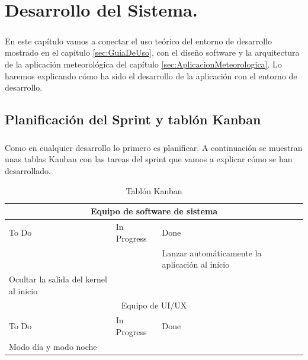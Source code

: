 \chapter{Desarrollo del Sistema.}\label{sec:Desarrollo}

\paragraph{}En este capítulo vamos a conectar el uso teórico del entorno de desarrollo
mostrado en el capítulo \ref{sec:GuiaDeUso}, con el diseño software y la arquitectura de
la aplicación meteorológica del capítulo \ref{sec:AplicacionMeteorologica}. Lo haremos
explicando cómo ha sido el desarrollo de la aplicación con el entorno de desarrollo.

\section{Planificación del Sprint y tablón Kanban}

\paragraph{}Como en cualquier desarrollo lo primero es planificar. A continuación se
muestran unas tablas Kanban con las tareas del sprint que vamos a explicar cómo se
han desarrollado.

\begin{table}[H]
\begin{center}
\begin{tabular}{| p{} | p{} | p{} |}
    \hline
    \multicolumn{3}{|c|}{Equipo de software de sistema} \\
    \hline
    To Do & In Progress & Done \\
    \hline
    \hline
    &  & Lanzar automáticamente la aplicación al inicio \\
    Ocultar la salida del kernel al inicio &  &  \\
    \hline
    \hline
    \multicolumn{3}{|c|}{Equipo de UI/UX} \\
    \hline
    To Do & In Progress & Done \\
    \hline
    \hline
    Modo día y modo noche &  & \\
    \hline
\end{tabular}
\caption{Tablón Kanban}
\label{tab:Kanban}
\end{center}
\end{table}

